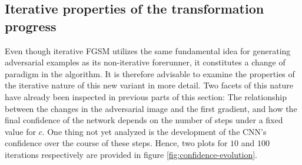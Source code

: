 \documentclass[11pt, a4paper]{article}
\begin{document}
\subsection{Iterative properties of the transformation progress}
\label{subsec:iterative-properties}
Even though iterative FGSM utilizes the same fundamental idea for generating adversarial examples as its non-iterative forerunner, it constitutes a change of paradigm in the algorithm. It is therefore advisable to examine the properties of the iterative nature of this new variant in more detail. Two facets of this nature have already been inspected in previous parts of this section: The relationship between the changes in the adversarial image and the first gradient, and how the final confidence of the network depends on the number of steps under a fixed value for $c$. One thing not yet analyzed is the development of the CNN's confidence over the course of these steps. Hence, two plots for $10$ and $100$ iterations respectively are provided in figure \ref{fig:confidence-evolution}.
\end{document}
